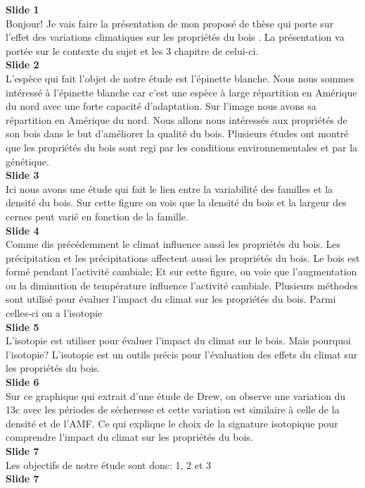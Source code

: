 \documentclass[a4paper,12pt]{report}
\begin{document}
	\textbf{Slide 1}\\
Bonjour! Je vais faire la présentation de mon proposé de thèse qui porte sur l'effet des variations climatiques sur les propriétés du bois . La présentation va portée sur le contexte du sujet et les 3 chapitre de celui-ci.\\
	
	\textbf{Slide 2}\\	
L'espèce qui fait l'objet de notre étude est l'épinette blanche. Nous nous sommes intéressé à l'épinette blanche car c'est une espèce à large répartition en Amérique du nord avec une forte capacité d'adaptation. Sur l'image nous avons sa répartition en Amérique du nord. Nous allons nous intéressés aux propriétés de son bois dans le but d'améliorer la qualité du bois. Plusieurs études ont montré que les propriétés du bois sont regi par les conditions environnementales et par la génétique.\\  
	
	\textbf{Slide 3}\\
Ici nous avons une étude qui fait le lien entre la variabilité des familles et la densité du bois. Sur cette figure on vois que la densité du bois et la largeur des cernes peut varié en fonction de la famille.\\
	
	\textbf{Slide 4}\\
Comme dis précédemment le climat influence aussi les propriétés du bois. Les précipitation et les précipitations affectent aussi les propriétés du bois. Le bois est formé pendant l'activité cambiale; Et sur cette figure, on voie que l'augmentation ou la diminution de température influence l'activité cambiale. Plusieurs méthodes sont utilisé pour évaluer l'impact du climat sur les propriétés du bois. Parmi celles-ci on a l'isotopie\\

\textbf{Slide 5}\\
L'isotopie est utiliser pour évaluer l'impact du climat sur le bois. Mais pourquoi l'isotopie? L'isotopie est un outils précis pour l'évaluation des effets du climat sur les propriétés du bois.\\

\textbf{Slide 6}\\
Sur ce graphique qui extrait d'une étude de Drew, on observe une variation du 13c avec les périodes de sécheresse et cette variation est similaire à celle de la densité et de l'AMF. Ce qui explique le choix de la signature isotopique pour comprendre l'impact du climat sur les propriétés du bois.\\

\textbf{Slide 7}\\
Les objectifs de notre étude sont donc: 1, 2 et 3\\


\textbf{Slide 7}\\
\end{document}

